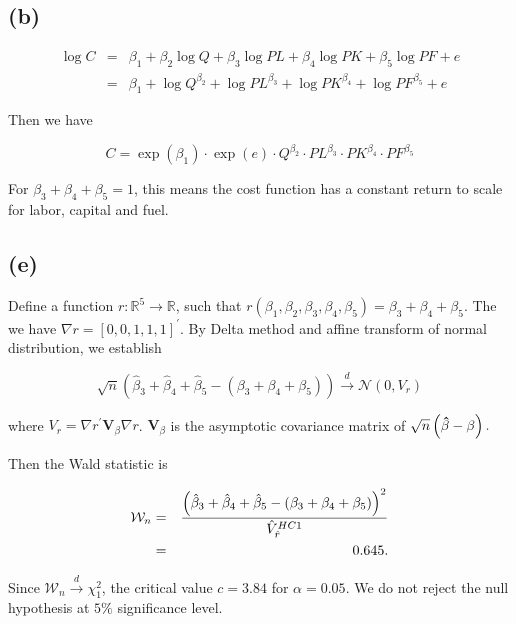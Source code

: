 \documentclass{article}
\begin{document}
\subsection*{(b)}

\begin{eqnarray*}
\log C &=&\beta _{1}+\beta _{2}\log Q+\beta _{3}\log PL+\beta _{4}\log
PK+\beta _{5}\log PF+e \\
&=&\beta _{1}+\log Q^{\beta _{2}}+\log PL^{\beta _{3}}+\log PK^{\beta
_{4}}+\log PF^{\beta _{5}}+e
\end{eqnarray*}

Then we have

\begin{equation*}
C=\exp \left( \beta _{1}\right) \cdot \exp \left( e\right) \cdot Q^{\beta
_{2}}\cdot PL^{\beta _{3}}\cdot PK^{\beta _{4}}\cdot PF^{\beta _{5}}
\end{equation*}

For $\beta _{3}+\beta _{4}+\beta _{5}=1$, this means the cost function has a
constant return to scale for labor, capital and fuel.

\subsection*{(e)}

Define a function $r:\mathbb{R}^{5}\rightarrow \mathbb{R}$, such that $%
r\left( \beta _{1},\beta _{2},\beta _{3},\beta _{4},\beta _{5}\right) =\beta
_{3}+\beta _{4}+\beta _{5}$. The we have $\nabla r=\left[ 0,0,1,1,1\right]
^{\prime }$. By Delta method and affine transform of normal distribution, we
establish

\begin{equation*}
\sqrt{n}\left( \hat{\beta}_{3}+\hat{\beta}_{4}+\hat{\beta}_{5}-\left( \beta
_{3}+\beta _{4}+\beta _{5}\right) \right) \overset{d}{\longrightarrow }%
\mathcal{N}\left( 0,V_{r}\right) 
\end{equation*}

where $V_{r}=\nabla r^{\prime }\mathbf{V}_{\beta }\nabla r$. $\mathbf{V}%
_{\beta }$ is the asymptotic covariance matrix of $\sqrt{n}\left( \mathbf{%
\hat{\beta}-\beta }\right) .$

Then the Wald statistic is

\begin{eqnarray*}
\mathcal{W}_{n} &=&\frac{\left( \hat{\beta}_{3}+\hat{\beta}_{4}+\hat{\beta}%
_{5}-\left( \beta _{3}+\beta _{4}+\beta _{5}\right) \right) ^{2}}{\hat{V}_{%
\hat{r}}^{HC1}} \\
&=&0.645.
\end{eqnarray*}

Since $\mathcal{W}_{n}\overset{d}{\longrightarrow }\chi _{1}^{2}$, the
critical value $c=3.84$ for $\alpha =0.05.$ We do not reject the null
hypothesis at $5\%$ significance level.
\end{document}
